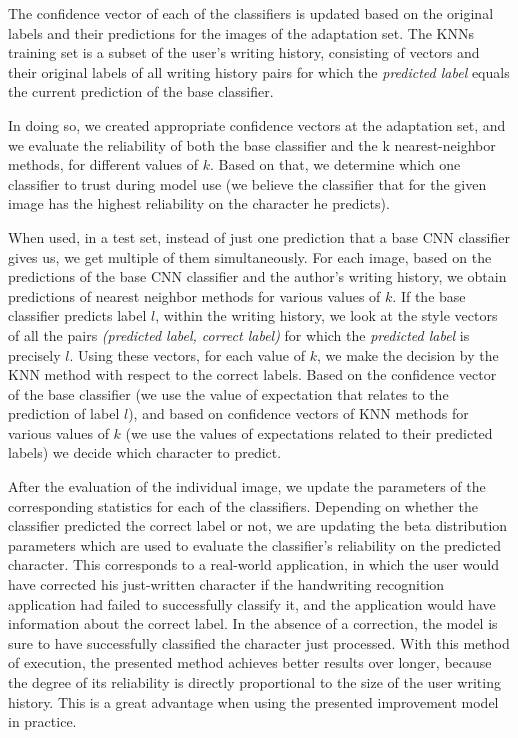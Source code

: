 \documentclass{article}
\begin{document}
The confidence vector of each of the classifiers is updated based on the original labels and their predictions for the images of the adaptation set.
The KNNs training set is a subset of the user's writing history, consisting of vectors and their original labels of all writing history pairs for
which the \textit{predicted label} equals the current prediction of the base classifier.

In doing so, we created appropriate confidence vectors at the adaptation set, and we evaluate the reliability of both the base classifier and the k nearest-neighbor methods, for different values of $k$.
Based on that, we determine which one classifier to trust during model use (we believe the classifier that for the given image has the highest reliability on the character he predicts).

When used, in a test set, instead of just one prediction that a base CNN classifier gives us, we get multiple of them simultaneously.
For each image, based on the predictions of the base CNN classifier and the author's writing history, we obtain predictions of nearest neighbor methods for various values of $k$.
If the base classifier predicts label $l$, within the writing history, we look at the style vectors of all the pairs \textit{(predicted label, correct label)} for which the \textit{predicted label} is precisely $l$.
Using these vectors, for each value of $k$, we make the decision by the KNN method with respect to the correct labels.
Based on the confidence vector of the base classifier (we use the value of expectation that relates to the prediction of label $l$), and based on confidence vectors of KNN methods for various values of $k$
(we use the values of expectations related to their predicted labels) we decide which character to predict.

After the evaluation of the individual image, we update the parameters of the corresponding statistics for each of the classifiers.
Depending on whether the classifier predicted the correct label or not, we are updating the beta distribution parameters which are used to evaluate the classifier's reliability on the predicted character.
This corresponds to a real-world application, in which the user would have corrected his just-written character if the handwriting recognition application had failed to successfully classify it,
and the application would have information about the correct label.
In the absence of a correction, the model is sure to have successfully classified the character just processed.
With this method of execution, the presented method achieves better results over longer, because the degree of its reliability is directly proportional to the size of the user writing history.
This is a great advantage when using the presented improvement model in practice.
\end{document}
